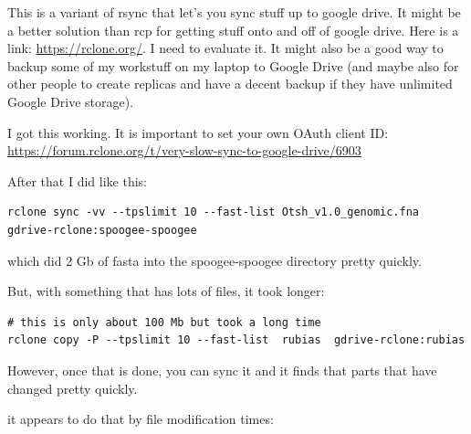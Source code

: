 \documentclass[]{krantz}
\begin{document}
This is a variant of rsync that let's you sync stuff up to google drive. It might be a better
solution than rcp for getting stuff onto and off of google drive. Here is a link:
\url{https://rclone.org/}. I need to evaluate it. It might also be a good way
to backup some of my workstuff on my laptop to Google Drive (and maybe also for other people to create replicas and have a decent backup if they have unlimited Google Drive storage).

I got this working. It is important to set your own OAuth client ID:
\url{https://forum.rclone.org/t/very-slow-sync-to-google-drive/6903}

After that I did like this:

\begin{verbatim}
rclone sync -vv --tpslimit 10 --fast-list Otsh_v1.0_genomic.fna  gdrive-rclone:spoogee-spoogee
\end{verbatim}

which did 2 Gb of fasta into the spoogee-spoogee directory pretty quickly.

But, with something that has lots of files, it took longer:

\begin{verbatim}
# this is only about 100 Mb but took a long time
rclone copy -P --tpslimit 10 --fast-list  rubias  gdrive-rclone:rubias
\end{verbatim}

However, once that is done, you can sync it and it finds that parts that have changed pretty quickly.

it appears to do that by file modification times:
\end{document}
